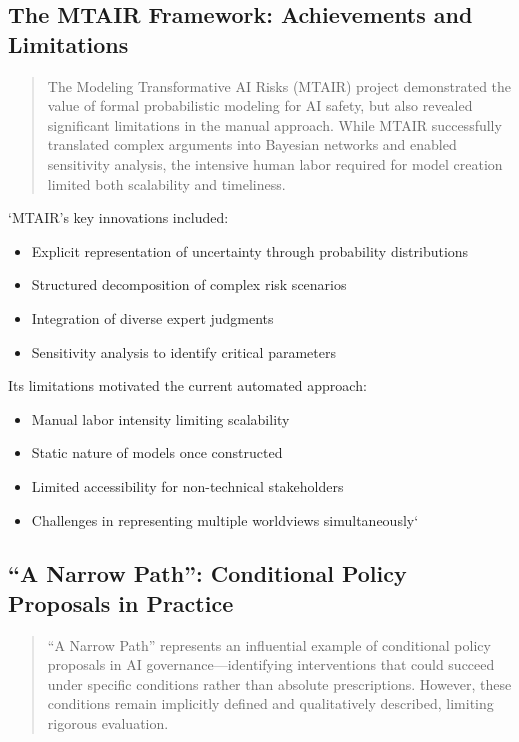 \documentclass[12pt,a4paper]{report}
\providecommand{\tightlist}{%
  \setlength{\itemsep}{0pt}\setlength{\parskip}{0pt}}
\begin{document}
\subsection{The MTAIR Framework: Achievements and
Limitations}\label{sec-mtair-framework}

\begin{quote}
The Modeling Transformative AI Risks (MTAIR) project demonstrated the
value of formal probabilistic modeling for AI safety, but also revealed
significant limitations in the manual approach. While MTAIR successfully
translated complex arguments into Bayesian networks and enabled
sensitivity analysis, the intensive human labor required for model
creation limited both scalability and timeliness.
\end{quote}

`MTAIR's key innovations included:

\begin{itemize}
\tightlist
\item
  Explicit representation of uncertainty through probability
  distributions
\item
  Structured decomposition of complex risk scenarios
\item
  Integration of diverse expert judgments
\item
  Sensitivity analysis to identify critical parameters
\end{itemize}

Its limitations motivated the current automated approach:

\begin{itemize}
\tightlist
\item
  Manual labor intensity limiting scalability
\item
  Static nature of models once constructed
\item
  Limited accessibility for non-technical stakeholders
\item
  Challenges in representing multiple worldviews simultaneously`
\end{itemize}

\subsection{``A Narrow Path'': Conditional Policy Proposals in
Practice}\label{sec-narrow-path}

\begin{quote}
``A Narrow Path'' represents an influential example of conditional
policy proposals in AI governance---identifying interventions that could
succeed under specific conditions rather than absolute prescriptions.
However, these conditions remain implicitly defined and qualitatively
described, limiting rigorous evaluation.
\end{quote}
\end{document}
